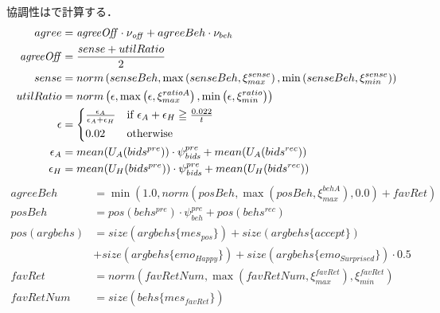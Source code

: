 協調性はで計算する．
\begin{align}
    agree &= \mathit{agreeOff} \cdot \nu_{\mathit{off}} + agreeBeh \cdot \nu_{beh} \label{eq:agreeableness} \\
    \mathit{agreeOff} &= \frac{sense + utilRatio}{2} \nonumber \\
    sense &= norm \left(senseBeh, \max \left(senseBeh, \xi_{max}^{sense}\right), \min \left(senseBeh, \xi_{min}^{sense}\right) \right) \nonumber \\
    utilRatio &= norm \left(\epsilon, \max \left(\epsilon, \xi_{max}^{ratioA}\right), \min \left(\epsilon, \xi_{min}^{ratio}\right) \right) \nonumber \\
    \epsilon &= 
    \begin{cases*}
        \frac{\epsilon_A}{\epsilon_A + \epsilon_H} & if $\epsilon_A + \epsilon_H \geqq \frac{0.022}{t}$  \\
        0.02 & otherwise 
    \end{cases*} \nonumber \\
    \epsilon_A &= mean(U_A(bids^{pre})) \cdot \psi_{\mathit{bids}}^{pre} + mean(U_A(bids^{rec})) \nonumber \\
    \epsilon_H &= mean(U_H(bids^{pre})) \cdot \psi_{\mathit{bids}}^{pre} + mean(U_H(bids^{rec})) \nonumber 
\end{align}
\begin{align}
    agreeBeh &= \min \left( 1.0, norm\left( \mathit{posBeh}, \max \left( \mathit{posBeh}, \xi_{max}^{\mathit{behA}}\right), 0.0 \right) + \mathit{favRet}\right) \nonumber \\
    posBeh &=  pos(behs^{pre}) \cdot \psi_{beh}^{pre} + pos(behs^{rec}) \nonumber \\
    pos(argbehs) &= size(argbehs\{mes_{pos}\}) + size(argbehs\{accept\}) \nonumber \\
    &+ size(argbehs\{emo_{Happy}\}) \nonumber + size(argbehs\{emo_{Surprised}\}) \cdot 0.5 \nonumber \\
    \mathit{favRet} &= norm\left( \mathit{favRetNum}, \max \left( \mathit{favRetNum}, \xi_{max}^{\mathit{favRet}}\right), \xi_{min}^{\mathit{favRet}} \right) \nonumber \\
    \mathit{favRetNum} &= size(behs\{mes_{\mathit{favRet}}\}) \nonumber
\end{align}

